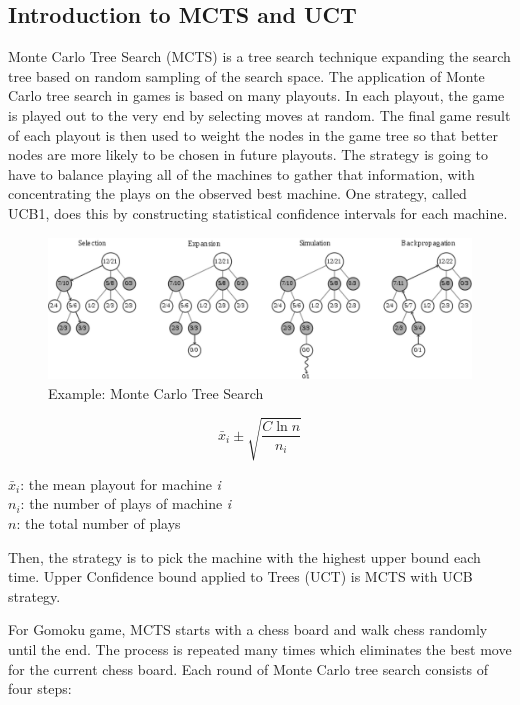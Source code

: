 \documentclass[12pt,a4paper]{article}
\begin{document}
\subsection{Introduction to MCTS and UCT}
\par Monte Carlo Tree Search (MCTS) is a tree search technique expanding the search tree based on random sampling of the search space. The application of Monte Carlo tree search in games is based on many playouts. In each playout, the game is played out to the very end by selecting moves at random. The final game result of each playout is then used to weight the nodes in the game tree so that better nodes are more likely to be chosen in future playouts. The strategy is going to have to balance playing all of the machines to gather that information, with concentrating the plays on the observed best machine. One strategy, called UCB1, does this by constructing statistical confidence intervals for each machine.

\begin{figure}[!ht]
\centering\includegraphics[width=6in]{1.png}
\caption{Example: Monte Carlo Tree Search}
\end{figure}

\begin{displaymath}
\bar{x}_i \pm \sqrt{\frac{C\ln n}{n_i}}
\end{displaymath}
\begin{center}
$\bar{x}_i$: the mean playout for machine \emph{i}\\
$n_i$: the number of plays of machine \emph{i} \\
$n$: the total number of plays
\end{center}
Then, the strategy is to pick the machine with the highest upper bound each time. Upper Confidence bound applied to Trees (UCT)
is MCTS with UCB strategy.
\par For Gomoku game, MCTS starts with a chess board and walk chess randomly until the end. The process is repeated many times which eliminates the best move for the current chess board. Each round of Monte Carlo tree search consists of four steps:
\end{document}
